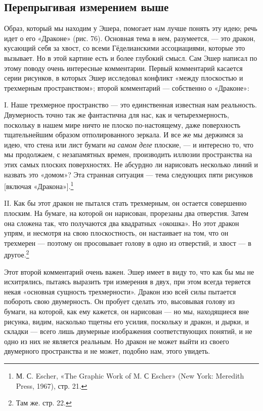 \documentclass[../main.tex]{subfiles}
\begin{document}
\subsection{Перепрыгивая измерением выше}

Образ, который мы находим у Эшера, помогает нам лучше понять эту идею; речь идет о его «Драконе» (рис. 76). Основная тема в нем, разумеется, --- это дракон, кусающий себя за хвост, со всеми Гёделианскими ассоциациями, которые это вызывает. Но в этой картине есть и более глубокий смысл. Сам Эшер написал по этому поводу очень интересные комментарии. Первый комментарий касается серии рисунков, в которых Эшер исследовал конфликт «между плоскостью и трехмерным пространством»; второй комментарий --- собственно о «Драконе»:

I. Наше трехмерное пространство --- это единственная известная нам реальность. Двумерность точно так же фантастична для нас, как и четырехмерность, поскольку в нашем мире ничто не плоско по-настоящему, даже поверхность тщательнейшим образом отполированного зеркала. И все же мы держимся за идею, что стена или лист бумаги \emph{на самом деле} плоские, --- и интересно то, что мы продолжаем, с незапамятных времен, производить иллюзии пространства на этих самых плоских поверхностях. Не абсурдно ли нарисовать несколько линий и назвать это «домом»? Эта странная ситуация --- тема следующих пяти рисунков {[}включая «Дракона»{]}.\footnote{М. С. Escher, «The Graphic Work of M. С Escher» (New York: Meredith Press, 1967), стр. 21.}

II. Как бы этот дракон не пытался стать трехмерным, он остается совершенно плоским. На бумаге, на которой он нарисован, прорезаны два отверстия. Затем она сложена так, что получаются два квадратных «окошка». Но этот дракон упрям, и несмотря на свою плоскостность, он настаивает на том, что он трехмерен --- поэтому он просовывает голову в одно из отверстий, и хвост --- в другое.\footnote{Там же. стр. 22.}

Этот второй комментарий очень важен. Эшер имеет в виду то, что как бы мы не исхитрялись, пытаясь выразить три измерения в двух, при этом всегда теряется некая «основная сущность трехмерности». Дракон изо всей силы пытается побороть свою двумерность. Он пробует сделать это, высовывая голову из бумаги, на которой, как ему кажется, он нарисован --- но мы, находящиеся вне рисунка, видим, насколько тщетны его усилия, поскольку и дракон, и дырки, и складки --- всего лишь двумерные изображения соответствующих понятий, и не одно из них не является реальным. Но дракон не может выйти из своего двумерного пространства и не может, подобно нам, этого увидеть.
\end{document}

